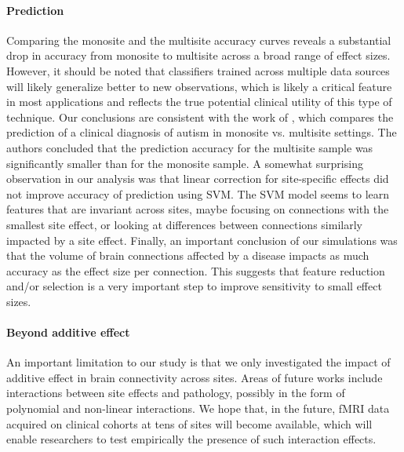 \documentclass[authoryear]{elsarticle}
\begin{document}
\paragraph{Prediction}
Comparing the monosite and the multisite accuracy curves reveals a substantial
drop in accuracy from monosite to multisite across a broad range of effect
sizes. However, it should be noted that classifiers trained across multiple data
sources will likely generalize better to new observations, which is likely a
critical feature in most applications and reflects the true potential clinical
utility of this type of technique. Our conclusions are consistent with the work of
\cite{Nielsen2013}, which compares the prediction of a clinical diagnosis of
autism in monosite vs. multisite settings. The authors concluded that the
prediction accuracy for the multisite sample was significantly smaller than for
the monosite sample. A somewhat surprising observation in our analysis was that linear
correction for site-specific effects did not improve accuracy of prediction using
SVM. The SVM model seems to learn features that are invariant across sites,
maybe focusing on connections with the smallest site effect, or looking at
differences between connections similarly impacted by a site effect. Finally, an
important conclusion of our simulations was that the volume of brain connections
affected by a disease impacts as much accuracy as the effect size per
connection. This suggests that feature reduction and/or selection is a very
important step to improve sensitivity to small effect sizes.

\paragraph{Beyond additive effect} An important limitation to our study is that we only investigated the impact of additive effect in brain connectivity across sites. Areas of future works include interactions between site effects and pathology, possibly in the form of polynomial and non-linear interactions. We hope that, in the future, fMRI data acquired on clinical cohorts at tens of sites will become available, which will enable researchers to test empirically the presence of such interaction effects. 
\end{document}
